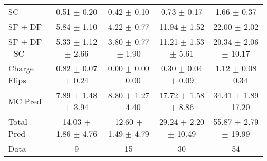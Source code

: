 \begin{tabular}{l|cccc}
                                 SC &  0.51 $\pm$  0.20 &  0.42 $\pm$  0.10 &  0.73 $\pm$  0.17 &  1.66 $\pm$  0.37 \\
                            SF + DF &  5.84 $\pm$  1.10 &  4.22 $\pm$  0.77 & 11.94 $\pm$  1.52 & 22.00 $\pm$  2.02 \\
\hline
                       SF + DF - SC &  5.33 $\pm$  1.12 $\pm$  2.66 &  3.80 $\pm$  0.77 $\pm$  1.90 & 11.21 $\pm$  1.53 $\pm$  5.61 & 20.34 $\pm$  2.06 $\pm$ 10.17 \\
\hline\hline
                       Charge Flips &  0.82 $\pm$  0.07 $\pm$  0.24 &  0.00 $\pm$  0.00 $\pm$  0.00 &  0.30 $\pm$  0.04 $\pm$  0.09 &  1.12 $\pm$  0.08 $\pm$  0.34 \\
\hline
                            MC Pred &  7.89 $\pm$  1.48 $\pm$  3.94 &  8.80 $\pm$  1.27 $\pm$  4.40 & 17.72 $\pm$  1.58 $\pm$  8.86 & 34.41 $\pm$  1.89 $\pm$ 17.20 \\
\hline
                         Total Pred & 14.03 $\pm$  1.86 $\pm$  4.76 & 12.60 $\pm$  1.49 $\pm$  4.79 & 29.24 $\pm$  2.20 $\pm$ 10.49 & 55.87 $\pm$  2.79 $\pm$ 19.99 \\
\hline\hline
                               Data &     9 &    15 &    30 &    54 \\
\hline\hline
\end{tabular}


